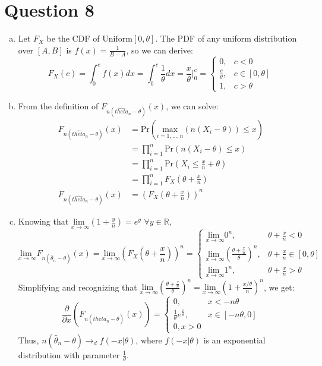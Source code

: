 \documentclass{article}
\newcommand{\R}{\mathbb{R}}
\newcommand{\lmt}{\underset{x\rightarrow\infty}{\text{lim }}}
\renewcommand{\Pr}[1]{\text{Pr}\left(#1\right)}
\begin{document}
\section*{Question 8}
\begin{enumerate}[(a)]
	\item Let $F_X$ be the CDF of $\text{Uniform}[0,\theta]$. The PDF of any uniform distribution over $[A,B]$ is ${f(x)=\frac{1}{B-A}}$, so we can derive:
		\[
			F_X(c) = \int_0^cf(x)dx = \int_0^c\frac{1}{\theta}dx = \frac{x}{\theta}|^c_0 =
				\begin{cases}
					0, 					&c<0			\\		
					\frac{c}{\theta}, 	&c\in[0,\theta] \\
					1, 					&c>\theta
				\end{cases}
		\]
		
	\item From the definition of $F_{n(\hat{theta}_n-\theta)}(x)$, we can solve:
		\begin{align*}
			F_{n(\hat{theta}_n-\theta)}(x) 	&= \Pr{\underset{i=1,...,n}{\text{max}}(n(X_i-\theta))\leq x}	\\
											&= \prod_{i=1}^n\Pr{n(X_i-\theta)\leq x}						\\
											&= \prod_{i=1}^n\Pr{X_i\leq\frac{x}{n}+\theta}					\\
											&= \prod_{i=1}^n F_X(\theta+\frac{x}{n})						\\
			F_{n(\hat{theta}_n-\theta)}(x) 	&=\left(F_X(\theta+\frac{x}{n})\right)^n
		\end{align*}
		
	\item Knowing that $\lmt(1+\frac{y}{n})=e^y$ $\forall y\in\R$,
		\[
			\lmt F_{n(\hat{\theta}_n-\theta)}(x) = \lmt(F_X(\theta+\frac{x}{n}))^n =
				\begin{cases}
					\lmt 0^n , &\theta+\frac{x}{n}<0 	\\
					\lmt \left(\frac{\theta + \frac{x}{n}}{\theta}\right)^n, &\theta+\frac{x}{n}\in[0,\theta]	\\
					\lmt 1^n, &\theta + \frac{x}{n}>\theta
				\end{cases}
		\]
		Simplifying and recognizing that ${\lmt \left(\frac{\theta + \frac{x}{n}}{\theta}\right)^n = \lmt\left(1+\frac{x/\theta}{n}\right)^n}$, we get:
		\[
			\frac{\partial}{\partial x}\left(F_{n(\hat{theta}_n-\theta)}(x)\right) = 
				\begin{cases}
					0, &x<-n\theta \\
					\frac{1}{\theta}e^\frac{x}{\theta}, &x\in[-n\theta,0] \\
					0, x>0
				\end{cases}
		\]
		Thus, $n(\hat{\theta}_n-\theta)\rightarrow_d f(-x|\theta)$, where $f(-x|\theta)$ is an exponential distribution with parameter $\frac{1}{\theta}$.
\end{enumerate}
\end{document}
